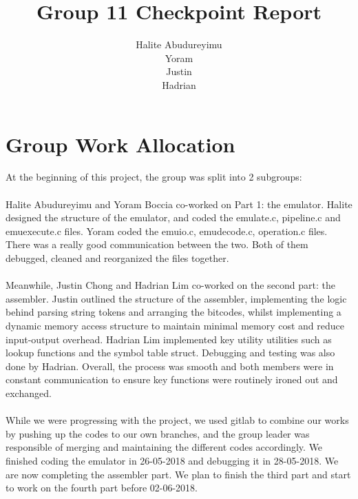 \documentclass[a4paper]{article}
\title{Group 11 Checkpoint Report}
\author{Halite Abudureyimu\\Yoram\\Justin\\Hadrian}
\begin{document}
\maketitle

\section{Group Work Allocation}
At the beginning of this project, the group was split into 2 subgroups:\\ \\
Halite Abudureyimu and Yoram Boccia co-worked on Part 1: the emulator. Halite designed the structure of the emulator, and coded the emulate.c, pipeline.c and emuexecute.c files. Yoram coded the emuio.c, emudecode.c, operation.c files. There was a really good communication between the two. Both of them debugged, cleaned and reorganized the files together.
\\\\
Meanwhile, Justin Chong and Hadrian Lim co-worked on the second part: the assembler. Justin outlined the structure of the assembler, implementing the logic behind parsing string tokens and arranging the bitcodes, whilst implementing a dynamic memory access structure to maintain minimal memory cost and reduce input-output overhead. Hadrian Lim implemented key utility utilities such as lookup functions and the symbol table struct. Debugging and testing was also done by Hadrian. Overall, the process was smooth and both members were in constant communication to ensure key functions were routinely ironed out and exchanged.
\\\\

While we were progressing with the project, we used gitlab to combine our works by pushing up the codes to our own branches, and the group leader was responsible of merging and maintaining the different codes accordingly.
We finished coding the emulator in 26-05-2018 and debugging it in 28-05-2018. We are now completing the assembler part. We plan to finish the third part and start to work on the fourth part before 02-06-2018.
\end{document}
